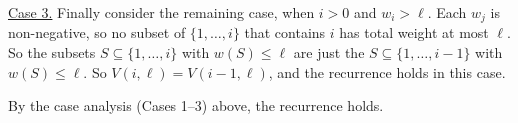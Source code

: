 \begin{longFormProof}
  \smallskip 
  \begin{block}
    \step \underline{Case 3.}  Finally consider the remaining case, when $i>0$ and $w_i > \ell$.
    \step Each $w_j$ is non-negative, so no subset of $\{1,\ldots,i\}$ that contains $i$ has total weight at most $\ell$.
    \step So the subsets $S\subseteq \{1,\ldots,i\}$ with $w(S)\le\ell$
    are just the $S\subseteq\{1,\ldots,i-1\}$ with $w(S)\le\ell$.
    \step So $V(i, \ell) = V(i-1,\ell)$, and the recurrence holds in this case.
  \end{block}

  \smallskip
  \step By the case analysis (Cases 1--3) above, the recurrence holds.
\end{longFormProof}








      


